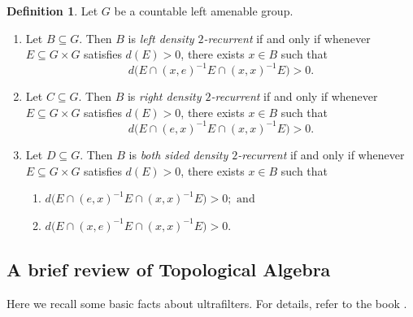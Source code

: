 \documentclass{article}
\theoremstyle{Theorem}
\theoremstyle{definition}
\newtheorem{defn}[thm]{Definition}
\begin{document}
\begin{defn}\label{def}
Let $G$ be a countable left amenable group.
\begin{enumerate}

\item
Let $B \subseteq G$. Then $B$ is \emph{left density $2$-recurrent} if and only if
whenever $E \subseteq G \times G$ satisfies $d(E) > 0$, there exists $x \in B$
such that
\[
d\bigl(E \cap (x,e)^{-1}E \cap (x,x)^{-1}E\bigr) > 0.
\]

\item
Let $C \subseteq G$. Then $B$ is \emph{right density $2$-recurrent} if and only if
whenever $E \subseteq G \times G$ satisfies $d(E) > 0$, there exists $x \in B$
such that
\[
d\bigl(E \cap (e,x)^{-1}E \cap (x,x)^{-1}E\bigr) > 0.
\]

\item
Let $D \subseteq G$. Then $B$ is \emph{both sided density $2$-recurrent} if and only if
whenever $E \subseteq G \times G$ satisfies $d(E) > 0$, there exists $x \in B$
such that
\begin{enumerate}
    \item $d\bigl(E \cap (e,x)^{-1}E \cap (x,x)^{-1}E\bigr) > 0; \text{ and } $
    \item $d\bigl(E \cap (x,e)^{-1}E \cap (x,x)^{-1}E\bigr) > 0.$
\end{enumerate}
\end{enumerate}
\end{defn}

\subsection{A brief review of Topological Algebra}
Here we recall some basic facts about ultrafilters. For details, refer to the book \cite{book}.
\end{document}
